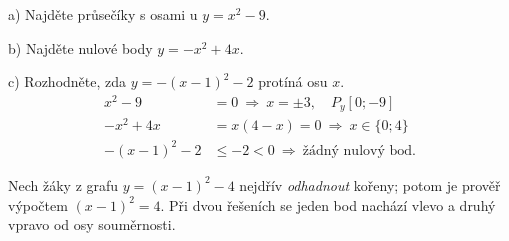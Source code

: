 \documentclass[11pt,a4paper]{article}
\begin{document}
\begin{zadaniReseniBox}[title={Samostatná práce 1}]
a) Najděte průsečíky s osami u $y=x^2-9$.\par
b) Najděte nulové body $y=-x^2+4x$.\par
c) Rozhodněte, zda $y=-(x-1)^2-2$ protíná osu $x$.
\tcblower
\[
\begin{aligned}
x^2-9&=0\ \Rightarrow\ x=\pm3,\quad P_y[0;-9] \\
-x^2+4x&=x(4-x)=0\ \Rightarrow\ x\in\{0;4\} \\
-(x-1)^2-2&\le-2<0\ \Rightarrow\ \text{žádný nulový bod.}
\end{aligned}
\]

\end{zadaniReseniBox}
Nech žáky z grafu $y=(x-1)^2-4$ nejdřív \emph{odhadnout} kořeny; potom je prověř výpočtem $(x-1)^2=4$. Při dvou řešeních se jeden bod nachází vlevo a druhý vpravo od osy souměrnosti.
\end{document}
